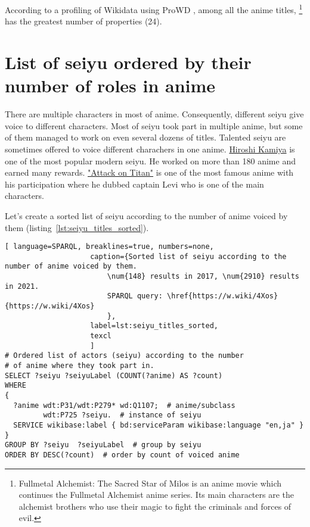 According to a profiling of Wikidata using ProWD \autocite{anime_prowd}, among all the anime titles, \footnote{Fullmetal Alchemist: The Sacred Star of Milos is an anime movie which continues the Fullmetal Alchemist anime series. Its main characters are the alchemist brothers who use their magic to fight the criminals and forces of evil.} has the greatest number of properties (\num{24}).

\section{List of seiyu ordered by their number of roles in anime}

There are multiple characters in most of anime. Consequently, different seiyu give voice to different characters. Most of seiyu took part in multiple anime, but some of them managed to work on even several dozens of titles. Talented seiyu are sometimes offered to voice different charachers in one anime. \href{https://w.wiki/4UFa}{Hiroshi Kamiya} is one of the most popular modern seiyu. He worked on more than 180 anime and earned many rewards. \href{https://w.wiki/4UFh}{"Attack on Titan"} is one of the most famous anime with his participation where he dubbed captain Levi who is one of the main characters.

Let's create a sorted list of seiyu according to the number of anime voiced by them (listing~\ref{lst:seiyu_titles_sorted}).

\begin{lstlisting}[ language=SPARQL, breaklines=true, numbers=none,
                    caption={Sorted list of seiyu according to the number of anime voiced by them.
                        \num{148} results in 2017, \num{2910} results in 2021.
                        SPARQL query: \href{https://w.wiki/4Xos}{https://w.wiki/4Xos}
                        },
                    label=lst:seiyu_titles_sorted,
                    texcl 
                    ]
# Ordered list of actors (seiyu) according to the number
# of anime where they took part in.
SELECT ?seiyu ?seiyuLabel (COUNT(?anime) AS ?count)
WHERE
{
  ?anime wdt:P31/wdt:P279* wd:Q1107;  # anime/subclass
         wdt:P725 ?seiyu.  # instance of seiyu
  SERVICE wikibase:label { bd:serviceParam wikibase:language "en,ja" }
}
GROUP BY ?seiyu  ?seiyuLabel  # group by seiyu 
ORDER BY DESC(?count)  # order by count of voiced anime
\end{lstlisting}%

